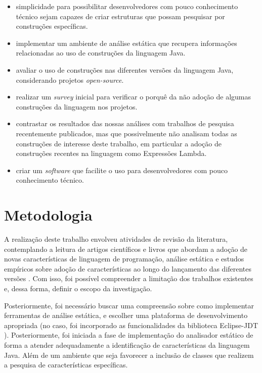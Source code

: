 	\begin{itemize}
		\item simplicidade para possibilitar desenvolvedores com pouco conhecimento técnico sejam capazes de criar estruturas que possam pesquisar por construções específicas.
	
	  \item implementar um ambiente de análise estática que recupera informações relacionadas ao uso  de construções da linguagem Java. 
	  
	  \item avaliar o uso de construções nas diferentes versões da linguagem Java, considerando  projetos \textit{open-source}. 
	  
	  \item realizar um \textit{survey} inicial para verificar o porquê da não adoção de algumas construções da linguagem nos projetos. 
	  
	  \item contrastar os resultados das nossas análises com trabalhos de pesquisa recentemente publicados, mas que possivelmente não analisam todas as construções de interesse deste trabalho, em particular 
	  a adoção de construções recentes na linguagem como Expressões Lambda. 
	  
	  \item criar um \textit{software} que facilite o uso para desenvolvedores com pouco conhecimento técnico.
	\end{itemize}

\section{Metodologia}

A realização deste trabalho envolveu atividades de revisão da literatura, contemplando a leitura de artigos científicos e livros que abordam a adoção de novas características de linguagem de programação, análise estática e estudos empíricos sobre adoção de características ao longo do lançamento das diferentes versões \cite{Schaefer:ACM2009,Parnin:ACM2011,Overbey:2009,bonifacio:scam2015}. Com isso, foi possível compreender a limitação dos trabalhos existentes e, dessa forma, definir o escopo da investigação. 

Posteriormente, foi necessário buscar uma compreensão sobre como implementar ferramentas de 
análise estática, e escolher uma plataforma de desenvolvimento apropriada (no caso, foi incorporado as funcionalidades da biblioteca Eclipse-JDT \cite{EclipseJDT}). Posteriormente, foi iniciada a fase de implementação do analisador estático de forma a atender adequadamente a identificação de características da linguagem Java. Além de um ambiente que seja favorecer a inclusão de classes que realizem a pesquisa de características específicas.   

